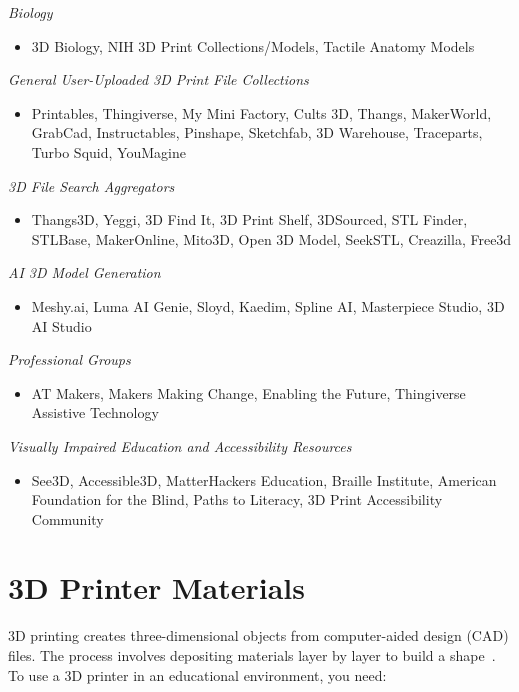 \emph{Biology}
\begin{itemize}
    \item 3D Biology, NIH 3D Print Collections/Models, Tactile Anatomy Models
\end{itemize}

\emph{General User-Uploaded 3D Print File Collections}
\begin{itemize}
    \item Printables, Thingiverse, My Mini Factory, Cults 3D, Thangs, MakerWorld, GrabCad, Instructables, Pinshape, Sketchfab, 3D Warehouse, Traceparts, Turbo Squid, YouMagine
\end{itemize}

\emph{3D File Search Aggregators}
\begin{itemize}
    \item Thangs3D, Yeggi, 3D Find It, 3D Print Shelf, 3DSourced, STL Finder, STLBase, MakerOnline, Mito3D, Open 3D Model, SeekSTL, Creazilla, Free3d
\end{itemize}

\emph{AI 3D Model Generation}
\begin{itemize}
    \item Meshy.ai, Luma AI Genie, Sloyd, Kaedim, Spline AI, Masterpiece Studio, 3D AI Studio
\end{itemize}

\emph{Professional Groups}
\begin{itemize}
    \item AT Makers, Makers Making Change, Enabling the Future, Thingiverse Assistive Technology
\end{itemize}

\emph{Visually Impaired Education and Accessibility Resources}
\begin{itemize}
    \item See3D, Accessible3D, MatterHackers Education, Braille Institute, American Foundation for the Blind, Paths to Literacy, 3D Print Accessibility Community
\end{itemize}

\section{3D Printer Materials}\label{d-printer-materials}
3D printing creates three-dimensional objects from computer-aided design (CAD) files. The process involves depositing materials layer by layer to build a shape~\cite{DassaultEducation}. To use a 3D printer in an educational environment, you need:

